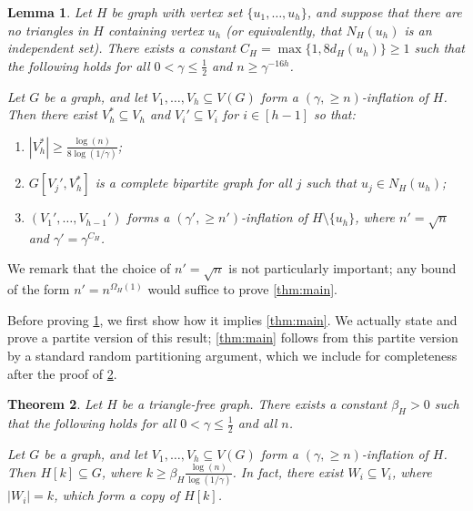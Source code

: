 \documentclass{aic}
\theoremstyle{plain}
\newtheorem{theorem}{Theorem}[section]
\newtheorem{lemma}[theorem]{Lemma}
\theoremstyle{remark}
\newcommand\ab[1]{\lvert #1 \rvert}
\begin{document}
\begin{lemma}\label{lem:induct}
    Let $H$ be graph with vertex set $\{u_1,\dots,u_h\}$, and suppose that there are no triangles in $H$ containing vertex $u_h$ (or equivalently, that $N_H(u_h)$ is an independent set). There exists a constant $C_H=\max \{1,8d_H(u_h)\}\geq 1$ such that the following holds for all $0<\gamma \leq \frac 12$ and $n \geq \gamma^{-16h}$.
    
    Let $G$ be a graph, and let $V_1,\dots,V_h \subseteq V(G)$ form a $(\gamma,\geq n)$-inflation of $H$.
    Then there exist $V_h^*\subseteq V_h$ and $V_i'\subseteq V_i$ for $i\in [h-1]$ so that:
    \begin{enumerate}
        \item $|V_h^*|\ge \frac{\log(n)}{8\log(1/\gamma)}$;
        \item $G[V_j',V_h^*]$ is a complete bipartite graph for all $j$ such that $u_j\in N_H(u_h)$;
        \item $(V_1',\dots,V_{h-1}')$ forms a $(\gamma',\geq n')$-inflation of $H \setminus \{u_h\}$, where $n' =\sqrt n$ and $\gamma' = \gamma^{C_H}$.
    \end{enumerate}
\end{lemma}
We remark that the choice of $n' = \sqrt n$ is not particularly important; any bound of the form $n' = n^{\Omega_H(1)}$ would suffice to prove \cref{thm:main}.

Before proving \cref{lem:induct}, we first show how it implies \cref{thm:main}. We actually state and prove a partite version of this result; \cref{thm:main} follows from this partite version by a standard random partitioning argument, which we include for completeness after the proof of \cref{thm:nikiforov partite}.
\begin{theorem}\label{thm:nikiforov partite}
    Let $H$ be a triangle-free graph. There exists a constant $\beta_H>0$ such that the following holds for all $0<\gamma\leq \frac 12$ and all $n$. 

    Let $G$ be a graph, and let $V_1,\dots,V_h \subseteq V(G)$ form a $(\gamma,\geq n)$-inflation of $H$. Then $H[k] \subseteq G$, where $k \geq \beta_H \frac{\log(n)}{\log(1/\gamma)}$. In fact, there exist $W_i \subseteq V_i$, where $\ab{W_i}=k$, which form a copy of $H[k]$.
\end{theorem}
\end{document}
